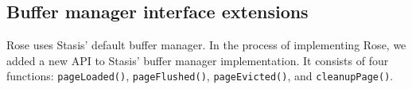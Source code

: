 \documentclass{vldb}
\newcommand{\rows}{Rose\xspace}
\newcommand{\rowss}{Rose's\xspace}
\begin{document}





\subsection{Buffer manager interface extensions}

\rows uses Stasis' default buffer manager.  In the process of
implementing \rows, we added a new API to
Stasis' buffer manager implementation.  It consists of four
functions: {\tt pageLoaded()}, {\tt pageFlushed()}, {\tt pageEvicted()},
and {\tt cleanupPage()}.
\end{document}
